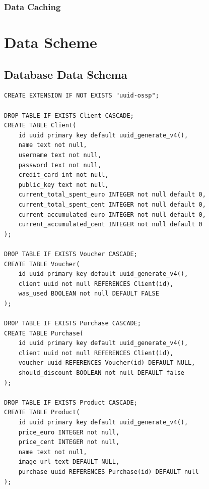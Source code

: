 \documentclass[12pt]{article}
\begin{document}
\subsubsection{Data Caching}


\pagebreak
\section{Data Scheme}

\subsection{Database Data Schema}
\begin{verbatim}
CREATE EXTENSION IF NOT EXISTS "uuid-ossp";

DROP TABLE IF EXISTS Client CASCADE;
CREATE TABLE Client(
	id uuid primary key default uuid_generate_v4(),
	name text not null,
	username text not null,
	password text not null,
	credit_card int not null,
	public_key text not null,
	current_total_spent_euro INTEGER not null default 0,
	current_total_spent_cent INTEGER not null default 0,
	current_accumulated_euro INTEGER not null default 0,
	current_accumulated_cent INTEGER not null default 0
);

DROP TABLE IF EXISTS Voucher CASCADE;
CREATE TABLE Voucher(
	id uuid primary key default uuid_generate_v4(),
	client uuid not null REFERENCES Client(id),
	was_used BOOLEAN not null DEFAULT FALSE
);

DROP TABLE IF EXISTS Purchase CASCADE;
CREATE TABLE Purchase(
	id uuid primary key default uuid_generate_v4(),
	client uuid not null REFERENCES Client(id),
	voucher uuid REFERENCES Voucher(id) DEFAULT NULL,
	should_discount BOOLEAN not null DEFAULT false
);

DROP TABLE IF EXISTS Product CASCADE;
CREATE TABLE Product(
	id uuid primary key default uuid_generate_v4(),
	price_euro INTEGER not null,
	price_cent INTEGER not null,
	name text not null,
	image_url text DEFAULT NULL,
	purchase uuid REFERENCES Purchase(id) DEFAULT null
);
\end{verbatim}
\end{document}
